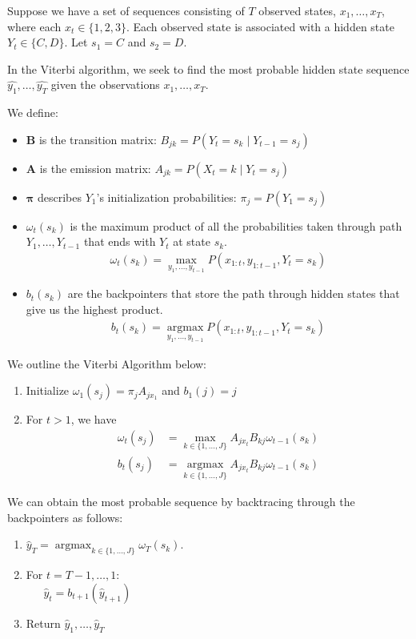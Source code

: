 \documentclass[11pt,addpoints,answers]{exam}
\newcommand \argmax {\operatorname*{argmax}}
\begin{document}
\begin{questions}
\question[4] Suppose we have a set of sequences consisting of $T$ observed states, $x_1,\dots,x_T$, where each $x_t \in \{1, 2, 3\}$. Each observed state is associated with a hidden state $Y_t \in\{C, D\}$. Let $s_1=C$ and $s_2=D$.

In the Viterbi algorithm, we seek to find the most probable hidden state sequence $\hat{y_1}, \dots, \hat{y_T}$ given the observations $x_1,\dots,x_T$. 

We define:
\begin{itemize}
    \item $\mathbf{B}$ is the transition matrix: $B_{jk} = P(Y_{t} = s_{k} \mid Y_{t-1} = s_{j})$
    \item $\mathbf{A}$ is the emission matrix: $A_{jk} = P(X_{t} = k \mid Y_{t} = s_{j})$
    \item $\boldsymbol{\pi}$ describes $Y_1$'s initialization probabilities: $\pi_j = P(Y_1 = s_j)$
    \item $\omega_t(s_k)$ is the maximum product of all the probabilities taken through path $Y_1, \dots, Y_{t-1}$ that ends with $Y_t$ at state $s_k$.
    \begin{align}
    \omega_t(s_k) = \max_{y_1,\dots, y_{t-1}} P(x_{1:t},y_{1:t-1},Y_t=s_k)    
    \end{align}
    \item $b_t(s_k)$ are the backpointers that store the path through hidden states that give us the highest product.
    \begin{align}
    b_t(s_k) = \argmax_{y_1,\dots, y_{t-1}} P(x_{1:t},y_{1:t-1},Y_t=s_k)    
    \end{align}
\end{itemize}

We outline the Viterbi Algorithm below:
\begin{enumerate}
    \item Initialize $\omega_1(s_j) = \pi_{j} A_{jx_{1}}$ and $b_1(j) = j$
    \item For $t > 1$, we have 
    \begin{align*}
        \omega_t(s_j) &= \max_{k \in \{1,\dots,J\}} A_{j x_{t}} B_{kj} \omega_{t-1}(s_k) \\
        b_t(s_j) &= \argmax_{k \in \{1,\dots,J\}} A_{j x_{t}} B_{kj} \omega_{t-1}(s_k)
    \end{align*}
\end{enumerate}

We can obtain the most probable sequence by backtracing through the backpointers as follows:
\begin{enumerate}
    \item $\hat{y}_T = \argmax_{k \in \{1,\dots,J\}} \omega_T(s_k)$. 
    \item For $t = T-1,\dots,1$: \\
    $~~~~~~~\hat{y}_{t} = b_{t+1}(\hat{y}_{t+1})$
    \item Return $\hat{y}_1, \dots, \hat{y}_T$
\end{enumerate}


\end{questions}
\end{document}

